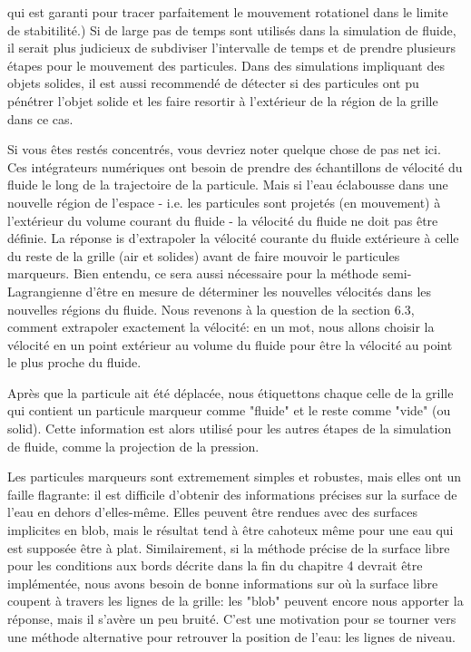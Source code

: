 \documentclass[11pt]{report}
\begin{document}
qui est garanti pour tracer parfaitement le mouvement rotationel dans le limite de stabitilité.) Si de large pas de temps sont utilisés dans la simulation de fluide, il serait plus judicieux de subdiviser l'intervalle de temps et de prendre plusieurs étapes pour le mouvement des particules. Dans des simulations impliquant des objets solides, il est aussi recommendé de détecter si des particules ont pu pénétrer l'objet solide et les faire resortir à l'extérieur de la région de la grille dans ce cas.\newline

Si vous êtes restés concentrés, vous devriez noter quelque chose de pas net ici. Ces intégrateurs numériques ont besoin de prendre des échantillons de vélocité du fluide le long de la trajectoire de la particule. Mais si l'eau éclabousse dans une nouvelle région de l'espace - i.e. les particules sont projetés (en mouvement) à l'extérieur du volume courant du fluide - la vélocité du fluide ne doit pas être définie. La réponse is d'extrapoler la vélocité courante du fluide extérieure à celle du reste de la grille (air et solides) avant de faire mouvoir le particules marqueurs. Bien entendu, ce sera aussi nécessaire pour la méthode semi-Lagrangienne d'être en mesure de déterminer les nouvelles vélocités dans les nouvelles régions du fluide. Nous revenons à la question de la section 6.3, comment extrapoler exactement la vélocité: en un mot, nous allons choisir la vélocité en un point extérieur au volume du fluide pour être la vélocité au point le plus proche du fluide.\newline

Après que la particule ait été déplacée, nous étiquettons chaque celle de la grille qui contient un particule marqueur comme "fluide" et le reste comme "vide" (ou solid). Cette information est alors utilisé pour les autres étapes de la simulation de fluide, comme la projection de la pression.\newline

Les particules marqueurs sont extremement simples et robustes, mais elles ont un faille flagrante: il est difficile d'obtenir des informations précises sur la surface de l'eau en dehors d'elles-même. Elles peuvent être rendues avec des surfaces implicites en blob, mais le résultat tend à être cahoteux même pour une eau qui est supposée être à plat. Similairement, si la méthode précise de la surface libre pour les conditions aux bords décrite dans la fin du chapitre 4 devrait être implémentée, nous avons besoin de bonne informations sur où la surface libre coupent à travers les lignes de la grille: les "blob" peuvent encore nous apporter la réponse, mais il s'avère un peu bruité. C'est une motivation pour se tourner vers une méthode alternative pour retrouver la position de l'eau: les lignes de niveau. \newline
\end{document}
